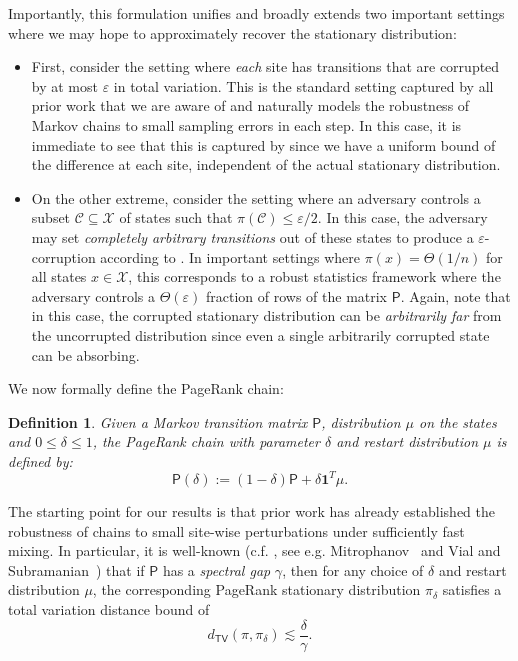 \documentclass[11pt]{article}
\newtheorem{defn}[thm]{Definition}
\theoremstyle{remark}
\begin{document}
Importantly, this formulation unifies and broadly extends two important settings where we may hope to approximately recover the stationary distribution:
\begin{itemize}
    \item First, consider the setting where \emph{each} site has transitions that are corrupted by at most $\varepsilon$ in total variation. This is the standard setting captured by all prior work that we are aware of and naturally models the robustness of Markov chains to small sampling errors in each step. In this case, it is immediate to see that this is captured by  since we have a uniform bound of the difference at each site, independent of the actual stationary distribution.
    \item On the other extreme, consider the setting where an adversary controls a subset $\mathcal{C}\subseteq \mathcal{X}$ of states such that $\pi(\mathcal{C})\leq \varepsilon/2$. In this case, the adversary may set \emph{completely arbitrary transitions} out of these states to produce a $\varepsilon$-corruption according to . In important settings where $\pi(x)=\Theta(1/n)$ for all states $x\in \mathcal{X}$, this corresponds to a robust statistics framework where the adversary controls a $\Theta(\varepsilon)$ fraction of rows of the matrix $\mathsf{P}$. Again, note that in this case, the corrupted stationary distribution can be \emph{arbitrarily far} from the uncorrupted distribution since even a single arbitrarily corrupted state can be absorbing.
\end{itemize}

We now formally define the PageRank chain:
\begin{defn} \label{def:page_rank}
Given a Markov transition matrix 
$\mathsf{P}$, distribution $\mu$ on the states and $0 \leq \delta \leq 1$, the 
\emph{PageRank chain} with parameter $\delta$ and restart distribution $\mu$
is defined by:
\[
\mathsf{P}(\delta):=(1-\delta)\mathsf{P}+\delta \bm{1}^T\mu.
\]
\end{defn}

The starting point for our results is that prior work has already established the robustness of chains to small site-wise perturbations under sufficiently fast mixing. 
In particular, it is well-known (c.f. , see e.g. Mitrophanov~\cite{mitrophanov2003stability} and Vial and Subramanian~\cite{subramanian}) 
that if $\mathsf{P}$ has a \emph{spectral gap} $\gamma$, then for any choice of $\delta$ and restart distribution $\mu$, the corresponding PageRank stationary distribution $\pi_{\delta}$ satisfies a total variation distance bound of
\begin{equation*}
    d_{\mathsf{TV}}(\pi,\pi_{\delta})\lesssim \frac{\delta}{\gamma}.
\end{equation*}
\end{document}
